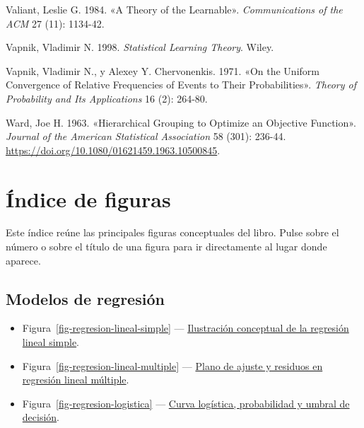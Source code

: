 \documentclass[
  spanish,
  10.5pt,
  letterpaper,
  DIV=11,
  numbers=noendperiod,
  oneside,
  open=any]{scrreprt}
\newlength{\cslhangindent}
\newenvironment{CSLReferences}[2] %
 {\begin{list}{}{%
  \setlength{\itemindent}{0pt}
  \setlength{\leftmargin}{0pt}
  \setlength{\parsep}{0pt}
  \ifodd #1
   \setlength{\leftmargin}{\cslhangindent}
   \setlength{\itemindent}{-1\cslhangindent}
  \fi
  \setlength{\itemsep}{#2\baselineskip}}}
 {\end{list}}
\providecommand{\tightlist}{%
  \setlength{\itemsep}{0pt}\setlength{\parskip}{0pt}}
\theoremstyle{definition}
\theoremstyle{definition}
\theoremstyle{plain}
\theoremstyle{remark}
\begin{document}
\begin{CSLReferences}{1}{1}
Valiant, Leslie G. 1984. {«A Theory of the Learnable»}.
\emph{Communications of the ACM} 27 (11): 1134-42.

Vapnik, Vladimir N. 1998. \emph{Statistical Learning Theory}. Wiley.

Vapnik, Vladimir N., y Alexey Y. Chervonenkis. 1971. {«On the Uniform
Convergence of Relative Frequencies of Events to Their Probabilities»}.
\emph{Theory of Probability and Its Applications} 16 (2): 264-80.

Ward, Joe H. 1963. {«Hierarchical Grouping to Optimize an Objective
Function»}. \emph{Journal of the American Statistical Association} 58
(301): 236-44. \url{https://doi.org/10.1080/01621459.1963.10500845}.

\end{CSLReferences}


\chapter*{Índice de figuras}\label{uxedndice-de-figuras}


Este índice reúne las principales figuras conceptuales del libro. Pulse
sobre el número o sobre el título de una figura para ir directamente al
lugar donde aparece.

\section*{Modelos de regresión}\label{modelos-de-regresiuxf3n-1}


\begin{itemize}
\tightlist
\item
  Figura~\ref{fig-regresion-lineal-simple} ---
  \hyperref[fig-regresion-lineal-simple]{Ilustración conceptual de la
  regresión lineal simple}.
\item
  Figura~\ref{fig-regresion-lineal-multiple} ---
  \hyperref[fig-regresion-lineal-multiple]{Plano de ajuste y residuos en
  regresión lineal múltiple}.
\item
  Figura~\ref{fig-regresion-logistica} ---
  \hyperref[fig-regresion-logistica]{Curva logística, probabilidad y
  umbral de decisión}.
\end{itemize}
\end{document}
